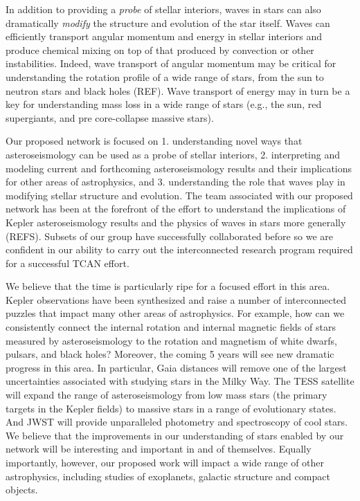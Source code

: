 In addition to providing a {\em probe} of stellar interiors, waves in stars can also dramatically {\em modify} the structure and evolution of the star itself.   Waves can efficiently transport angular momentum and energy in stellar interiors and produce chemical mixing on top of that produced by convection or other instabilities.   Indeed, wave transport of angular momentum may be critical for understanding the rotation profile of a wide range of stars, from the sun to neutron stars and black holes (REF).   Wave transport of energy may in turn be a key for understanding mass loss in a wide range of stars (e.g., the sun, red supergiants, and pre core-collapse massive stars).   

Our proposed network is focused on 1.  understanding novel ways that asteroseismology can be used as a probe of stellar interiors, 2. interpreting and modeling current and forthcoming asteroseismology results and their implications for other areas of astrophysics, and 3.  understanding the role that waves play in modifying stellar structure and evolution.  The team associated with our proposed network has been at the forefront of the effort to understand the implications of Kepler asteroseismology results and the physics of waves in stars more generally (REFS).  Subsets of our group have successfully collaborated before so we are confident in our ability to carry out the interconnected research program required for a successful TCAN effort.   

We believe that the time is particularly ripe for a focused effort in this area.  Kepler observations have been synthesized and raise a number of interconnected puzzles that impact many other areas of astrophysics.  For example, how can we consistently connect the internal rotation and internal magnetic fields of stars measured by asteroseismology to the rotation and magnetism of white dwarfs, pulsars, and black holes?  Moreover, the coming 5 years will see new dramatic progress in this area. In particular, Gaia distances will remove one of the largest uncertainties associated with studying stars in the Milky Way.  The TESS satellite will expand the range of asteroseismology from low mass stars (the primary targets in the Kepler fields) to massive stars in a range of evolutionary states.   And JWST will provide unparalleled photometry and spectroscopy of cool stars.    We believe that the improvements in our understanding of stars enabled by our network will be interesting and important in and of themselves.  Equally importantly, however, our proposed work will impact a wide range of other astrophysics, including studies of exoplanets, galactic structure and compact objects.   


